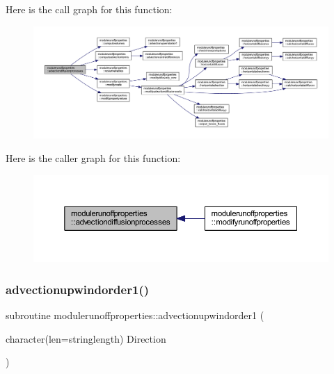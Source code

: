 Here is the call graph for this function\+:\nopagebreak
\begin{figure}[H]
\begin{center}
\leavevmode
\includegraphics[width=350pt]{namespacemodulerunoffproperties_ae6b8378908b26858152e5bb2b1132217_cgraph}
\end{center}
\end{figure}
Here is the caller graph for this function\+:\nopagebreak
\begin{figure}[H]
\begin{center}
\leavevmode
\includegraphics[width=350pt]{namespacemodulerunoffproperties_ae6b8378908b26858152e5bb2b1132217_icgraph}
\end{center}
\end{figure}
\mbox{\label{namespacemodulerunoffproperties_a6a694f9a334a389bdaca97db0bbc2f7b}} 
\subsubsection{\texorpdfstring{advectionupwindorder1()}{advectionupwindorder1()}}
{\footnotesize\ttfamily subroutine modulerunoffproperties\+::advectionupwindorder1 (\begin{DoxyParamCaption}\item[{character(len=stringlength)}]{Direction }\end{DoxyParamCaption})\hspace{0.3cm}{\ttfamily [private]}}

